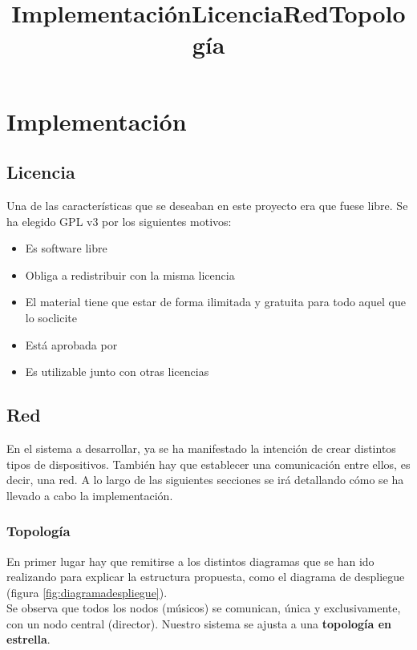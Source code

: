 \chapter{Implementación}
\title{Implementación}
\label{cap:Implementacion}

\section{Licencia}
\title{Licencia}

Una de las características que se deseaban en este proyecto era que fuese libre.
Se ha elegido GPL v3 por los siguientes motivos:
\begin{itemize}
  \item Es software libre
  \item Obliga a redistribuir con la misma licencia
  \item El material tiene que estar de forma ilimitada y gratuita para todo aquel que lo soclicite
  \item Está aprobada por 
  \item Es utilizable junto con otras licencias
\end{itemize}


\section{Red}
\title{Red}

En el sistema a desarrollar, ya se ha manifestado la intención de crear distintos
tipos de dispositivos. También hay que establecer una comunicación entre ellos,
es decir, una red. A lo largo de las siguientes secciones se irá detallando
cómo se ha llevado a cabo la implementación.\\

\subsection{Topología}
\title{Topología}
En primer lugar hay que remitirse a los distintos diagramas que se han ido
realizando para explicar la estructura propuesta, como el diagrama de despliegue (figura \ref{fig:diagramadespliegue}).\\

Se observa que todos los nodos (músicos) se comunican, única y exclusivamente, con un nodo central (director).
Nuestro sistema se ajusta a una \textbf{topología en estrella}.\\

